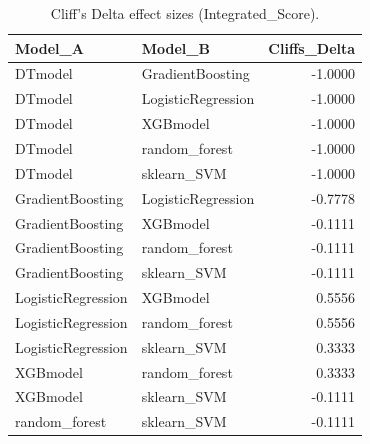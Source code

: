 \begin{table}[t]
\centering
\begin{tabular}{llr}
\toprule
Model_A & Model_B & Cliffs_Delta \\
\midrule
DTmodel & GradientBoosting & -1.0000 \\
DTmodel & LogisticRegression & -1.0000 \\
DTmodel & XGBmodel & -1.0000 \\
DTmodel & random_forest & -1.0000 \\
DTmodel & sklearn_SVM & -1.0000 \\
GradientBoosting & LogisticRegression & -0.7778 \\
GradientBoosting & XGBmodel & -0.1111 \\
GradientBoosting & random_forest & -0.1111 \\
GradientBoosting & sklearn_SVM & -0.1111 \\
LogisticRegression & XGBmodel & 0.5556 \\
LogisticRegression & random_forest & 0.5556 \\
LogisticRegression & sklearn_SVM & 0.3333 \\
XGBmodel & random_forest & 0.3333 \\
XGBmodel & sklearn_SVM & -0.1111 \\
random_forest & sklearn_SVM & -0.1111 \\
\bottomrule
\end{tabular}
\caption{Cliff's Delta effect sizes (Integrated_Score).}
\label{tab:cliffs_Integrated_Score}
\end{table}